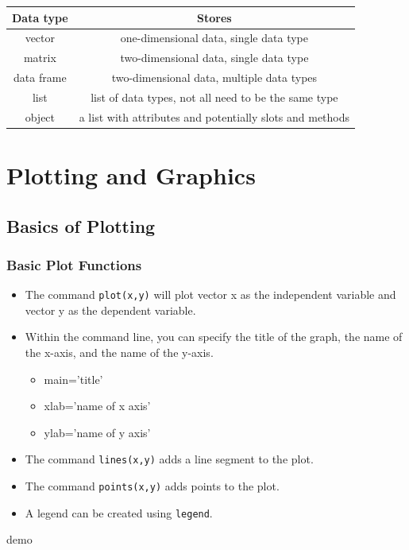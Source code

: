 \documentclass[]{article}
\theoremstyle{definition}
\theoremstyle{definition}
\theoremstyle{remark}
\begin{document}
\begin{longtable}[]{@{}cc@{}}
\toprule
Data type & Stores\tabularnewline
\midrule
\endhead
vector & one-dimensional data, single data type\tabularnewline
matrix & two-dimensional data, single data type\tabularnewline
data frame & two-dimensional data, multiple data types\tabularnewline
list & list of data types, not all need to be the same
type\tabularnewline
object & a list with attributes and potentially slots and
methods\tabularnewline
\bottomrule
\end{longtable}

\section{Plotting and Graphics}\label{plotting-and-graphics}

\subsection{Basics of Plotting}\label{basics-of-plotting}

\subsubsection{Basic Plot Functions}\label{basic-plot-functions}

\begin{itemize}
\item
  {The command \texttt{plot(x,y)} will plot vector x as the independent
  variable and vector y as the dependent variable.}
\item
  {Within the command line, you can specify the title of the graph, the
  name of the x-axis, and the name of the y-axis.}

  \begin{itemize}
  \item
    {main='title'}
  \item
    {xlab='name of x axis'}
  \item
    {ylab='name of y axis'}
  \end{itemize}
\item
  {The command \texttt{lines(x,y)} adds a line segment to the plot.}
\item
  {The command \texttt{points(x,y)} adds points to the plot.}
\item
  {A legend can be created using \texttt{legend}.}
\end{itemize}

{demo}
\end{document}
